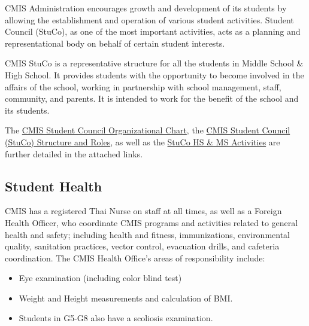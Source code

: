 
CMIS Administration encourages growth and development of its students by allowing the establishment and operation of various student activities. Student Council (StuCo), as one of the most important activities, acts as a planning and representational body on behalf of certain student interests.

CMIS StuCo is a representative structure for all the students in Middle School \& High School.  It provides students with the opportunity to become involved in the affairs of the school, working in partnership with school management, staff, community, and parents.  It is intended to work for the benefit of the school and its students. 
 
The \href{https://docs.google.com/a/cmis.ac.th/spreadsheets/d/1Dew5VG0EEek2lvCfLnK5dQa1G-KFTZV3qzR0FFJW1hA/edit?usp=sharing}{CMIS Student Council Organizational Chart}, the \href{https://docs.google.com/document/d/1eQY8B1nPq12prl7nvG42gDSqu9BSYTu-HvTZ22xnCjE/edit?usp=sharing}{CMIS Student Council (StuCo) Structure and Roles}, as well as the \href{https://docs.google.com/document/d/1jyWCNvdDBbUYXTOtACMD4BrgnmwtGNdOdigtEbqqMuM/edit?usp=sharing}{StuCo HS \& MS Activities} are further detailed in the attached links.  

\subsection{Student Health}

CMIS has a registered Thai Nurse on staff at all times, as well as a Foreign Health Officer, who coordinate CMIS programs and activities related to general health and safety; including health and fitness, immunizations, environmental quality, sanitation practices, vector control, evacuation drills, and cafeteria coordination.  The CMIS Health Office’s areas of responsibility include:

\begin{itemize}
\item Eye examination (including color blind test)
\item Weight and Height measurements and calculation of BMI. 
\item Students in G5-G8 also have a scoliosis examination. 
\end{itemize}


